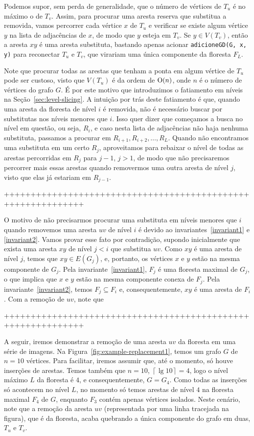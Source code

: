 Podemos supor, sem perda de generalidade, que o número de vértices de $T_u$ é no máximo o de $T_v$. Assim, para procurar uma aresta reserva que substitua a removida, vamos percorrer cada vértice $x$ de $T_u$ e verificar se existe algum vértice $y$ na lista de adjacências de $x$, de modo que $y$ esteja em $T_v$. Se $y \in V(T_v)$, então a aresta $xy$ é uma aresta substituta, bastando apenas acionar \texttt{adicioneGD(G, x, y)} para reconectar $T_u$ e $T_v$, que virariam uma única componente da floresta $F_L$.

Note que procurar todas as arestas que tenham a ponta em algum vértice de $T_u$ pode ser custoso, visto que $V(T_u)$ é da ordem de $\mathrm{O}(n)$, onde $n$ é o número de vértices do grafo $G$. É por este motivo que introduzimos o fatiamento em níveis na Seção~\ref{sec:level-slicing}. A intuição por trás deste fatiamento é que, quando uma aresta da floresta de nível $i$ é removida, não é necessário buscar por substitutas nos níveis menores que $i$. Isso quer dizer que começamos a busca no nível em questão, ou seja, $R_i$, e caso nesta lista de adjacências não haja nenhuma substituta, passamos a procurar em $R_{i+1}, R_{i + 2}, \ldots, R_L$. Quando não encontramos uma substituta em um certo $R_j$, aproveitamos para rebaixar o nível de todas as arestas percorridas em $R_j$ para $j - 1$, $j > 1$, de modo que não precisaremos percorrer mais essas arestas quando removermos uma outra aresta de nível $j$, visto que elas já estariam em $R_{j-1}$.

+++++++++++++++++++++++++++++++++++++++++++++++++++++++++++++

O motivo de não precisarmos procurar uma substituta em níveis menores que $i$ quando removemos uma aresta $uv$ de nível $i$ é devido ao invariantes~\ref{invariant1} e \ref{invariant2}. Vamos provar esse fato por contradição, supondo inicialmente que exista uma aresta $xy$ de nível $j < i$ que substitua $uv$. Como $xy$ é uma aresta de nível $j$, temos que $xy \in E(G_{j})$, e, portanto, os vértices $x$ e $y$ estão na mesma componente de $G_j$. Pela invariante~\ref{invariant1}, $F_j$ é uma floresta maximal de $G_j$, o que implica que $x$ e $y$ estão na mesma componente conexa de $F_j$. Pela invariante~\ref{invariant2}, temos $F_{j} \subseteq F_{i}$ e, consequentemente, $xy$ é uma aresta de $F_i$. Com a remoção de $uv$, note que 

+++++++++++++++++++++++++++++++++++++++++++++++++++++++++++++

A seguir, iremos demonstrar a remoção de uma aresta $uv$ da floresta em uma série de imagens. Na Figura~\ref{fig:example-replacement1}, temos um grafo $G$ de $n = 10$ vértices. Para facilitar, iremos assumir que, até o momento, só houve inserções de arestas. Temos também que $n = 10$, $\left\lceil \lg 10 \right\rceil = 4$, logo o nível máximo $L$ da floresta é $4$, e consequentemente, $G = G_4$. Como todas as inserções só acontecem no nível $L$, no momento só temos arestas de nível $4$ na floresta maximal $F_4$ de $G$, enquanto $F_3$ contém apenas vértices isolados. Neste cenário, note que 
a remoção da aresta $uv$ (representada por uma linha tracejada na figura), que é da floresta, acaba quebrando a única componente do grafo em duas, $T_u$ e $T_v$. 

